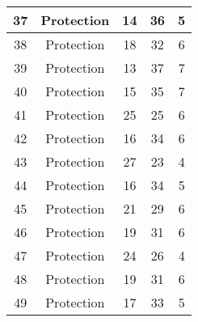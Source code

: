 \documentclass[results.tex]{subfiles}
\begin{document}
\begin{center}
\begin{tabular}{| c || c | c | c | c |}
            \hline
            37                      & Protection                   & 14                     & 36                      & 5                    \\
            \hline
            38                      & Protection                   & 18                     & 32                      & 6                    \\
            \hline
            39                      & Protection                   & 13                     & 37                      & 7                    \\
            \hline
            40                      & Protection                   & 15                     & 35                      & 7                    \\
            \hline
            41                      & Protection                   & 25                     & 25                      & 6                    \\
            \hline
            42                      & Protection                   & 16                     & 34                      & 6                    \\
            \hline
            43                      & Protection                   & 27                     & 23                      & 4                    \\
            \hline
            44                      & Protection                   & 16                     & 34                      & 5                    \\
            \hline
            45                      & Protection                   & 21                     & 29                      & 6                    \\
            \hline
            46                      & Protection                   & 19                     & 31                      & 6                    \\
            \hline
            47                      & Protection                   & 24                     & 26                      & 4                    \\
            \hline
            48                      & Protection                   & 19                     & 31                      & 6                    \\
            \hline
            49                      & Protection                   & 17                     & 33                      & 5                    \\
            \hline
        \end{tabular}
    \end{center}
\end{document}
